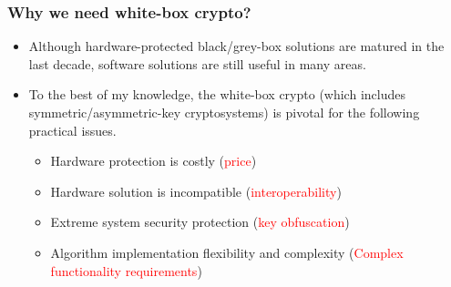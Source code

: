 \documentclass{beamer}
\begin{document}
\frame
{
\frametitle{Why we need white-box crypto?}
\begin{itemize}
\setlength{\itemsep}{12pt}
\item Although hardware-protected black/grey-box solutions are matured in the last decade, software solutions are still useful in many areas.

\item To the best of my knowledge, the white-box crypto (which includes symmetric/asymmetric-key cryptosystems) is pivotal for the following practical issues.
\begin{itemize}
\setlength{\itemsep}{12pt}
\item Hardware protection is costly (\textcolor{red}{price})
\item Hardware solution is incompatible (\textcolor{red}{interoperability})
\item Extreme system security protection (\textcolor{red}{key obfuscation})
\item Algorithm implementation flexibility and complexity (\textcolor{red}{Complex functionality requirements})
\end{itemize}
\end{itemize}

}
\end{document}
